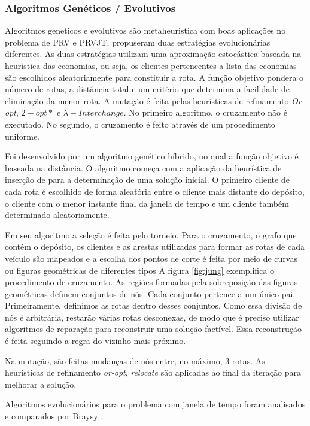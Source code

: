 \subsubsection{Algoritmos Genéticos / Evolutivos}

Algoritmos geneticos e evolutivos são metaheuristica com boas aplicações no problema de PRV e PRVJT, \cite{Homberger}  propuseram duas estratégias evolucionárias diferentes. As duas estratégias utilizam uma aproximação estocástica baseada na heurística das economias, ou seja, os clientes pertencentes a lista das economias são escolhidos aleatoriamente para constituir a rota. A função objetivo pondera o número de rotas, a distância total e um critério que determina a facilidade de eliminação da menor rota. A mutação é feita pelas heurísticas de refinamento \textit{Or-opt}, \({2-opt\ast}\) e \(\lambda-Interchange\). No primeiro algoritmo, o cruzamento não é executado. No segundo, o cruzamento é feito através de um procedimento uniforme.

Foi desenvolvido por \cite{Jung} um algoritmo genético híbrido, no qual a função objetivo é baseada na distância. O algoritmo começa com a aplicação da heurística de inserção de \cite{Solomon} para a determinação de uma solução inicial. O primeiro cliente de cada rota é escolhido de forma aleatória entre o cliente mais distante do depósito, o cliente com o menor instante final da janela de tempo e um cliente também determinado aleatoriamente. 

 Em seu algoritmo a seleção é feita pelo torneio. Para o cruzamento, o grafo que contém o depósito, os clientes e as arestas utilizadas para formar as rotas de cada veículo são mapeados e a escolha dos pontos de corte é feita por meio de curvas ou figuras geométricas de diferentes tipos A figura \ref{fig:jung} exemplifica o procedimento de cruzamento. As regiões formadas pela sobreposição das figuras geométricas definem conjuntos de nós. Cada conjunto pertence a um único pai. Primeiramente, definimos as rotas dentro desses conjuntos. Como essa divisão de nós é arbitrária, restarão várias rotas desconexas, de modo que é preciso utilizar algoritmos de reparação para reconstruir uma solução factível. Essa reconstrução é feita seguindo a regra do vizinho mais próximo.
 
 Na mutação, são feitas mudanças de nós entre, no máximo, 3 rotas. As heurísticas de refinamento \textit{or-opt}, \textit{relocate} são aplicadas ao final da iteração para melhorar a solução.  
 
 Algoritmos evolucionários para o problema com janela de tempo foram analisados e comparados por Braysy \cite{BraysyAG}.
 

